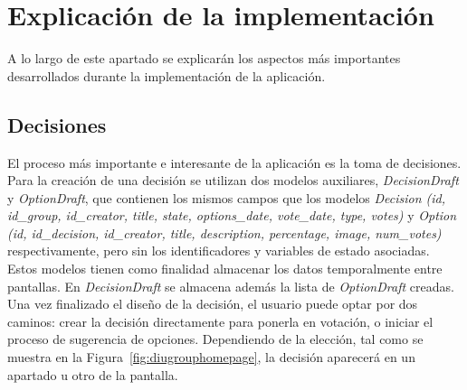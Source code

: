 \section{Explicación de la implementación}

A lo largo de este apartado se explicarán los aspectos más importantes desarrollados durante la implementación de la aplicación.

\subsection{Decisiones}

El proceso más importante e interesante de la aplicación es la toma de decisiones. Para la creación de una decisión se utilizan dos modelos auxiliares, \textit{DecisionDraft} y \textit{OptionDraft}, que contienen los mismos campos que los modelos \textit{Decision (id, id\_group, id\_creator, title, state, options\_date, vote\_date, type, votes)} y \textit{Option (id, id\_decision, id\_creator, title, description, percentage, image, num\_votes) }respectivamente, pero sin los identificadores y variables de estado asociadas. Estos modelos tienen como finalidad almacenar los datos temporalmente entre pantallas. En \textit{DecisionDraft} se almacena además la lista de \textit{OptionDraft} creadas. Una vez finalizado el diseño de la decisión, el usuario puede optar por dos caminos: crear la decisión directamente para ponerla en votación, o iniciar el proceso de sugerencia de opciones. Dependiendo de la elección, tal como se muestra en la Figura~\ref{fig:diugrouphomepage}, la decisión aparecerá en un apartado u otro de la pantalla. \\


